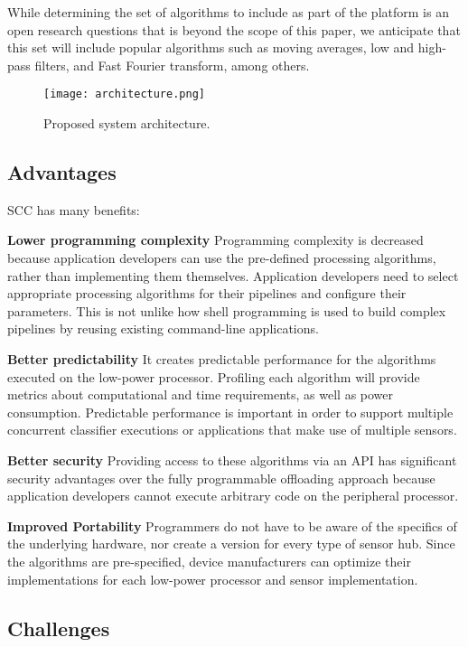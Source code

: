 While determining the set of algorithms to include as part 
of the platform is an open research questions that is beyond the scope 
of this paper, we anticipate that this set will include popular 
algorithms such as moving averages, low and high-pass filters, and Fast 
Fourier transform, among others.


\begin{figure}[t]
	\centering
	\texttt{[image: architecture.png]}
	\caption{Proposed system architecture.}
    \label{fig:architecture}
\end{figure}

\subsection{Advantages}

SCC has many benefits:

 {\bf Lower programming complexity}  Programming complexity is
  decreased because application developers can use the pre-defined
  processing algorithms, rather than implementing them themselves. 
  Application developers need to select appropriate processing 
  algorithms for their pipelines and configure their parameters. This 
  is not unlike how shell programming is used to build complex 
  pipelines by reusing existing command-line applications.
  

{\bf Better predictability} It 
  creates predictable performance for the algorithms executed on the
  low-power processor. Profiling each algorithm will provide metrics
  about computational and time requirements, as well as power
  consumption.  Predictable performance is important in order to
  support multiple concurrent classifier executions or applications
  that make use of multiple sensors.


{\bf Better security} Providing access to these algorithms via
  an API has significant security advantages over the fully
  programmable offloading approach because application developers
  cannot execute arbitrary code on the peripheral processor. 


{\bf Improved Portability} Programmers do not have to be
  aware of the specifics of the underlying hardware, nor create a version
  for every type of sensor hub. Since the algorithms are
  pre-specified, device manufacturers can optimize their
  implementations for each low-power processor and sensor
  implementation.



\subsection{Challenges}
\label{sec:challenges}

